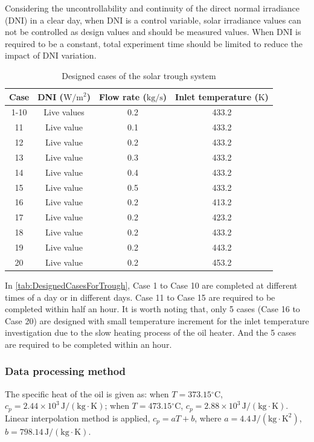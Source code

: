 
Considering the uncontrollability and continuity of the direct normal irradiance (DNI) in a clear day, when DNI is a control variable, solar irradiance values can not be controlled as design values and should be measured values. When DNI is required to be a constant, total experiment time should be limited to reduce the impact of DNI variation.

\begin{table}[htbp]\footnotesize
	\caption{Designed cases of the solar trough system}
	\centering
	\begin{tabular}{cccc}
		\toprule
		Case	& DNI ($\mathrm{W/m^2}$)	&	Flow rate ($\mathrm{kg/s}$)			&	Inlet temperature ($\mathrm{K}$)\\
		\midrule
		1-10	&	Live values	&	0.2	&	433.2\\
		11	&	Live value	&	0.1	&	433.2\\
		12	&	Live value	&	0.2	&	433.2\\
		13	&	Live value	&	0.3	&	433.2\\
		14	&	Live value	&	0.4	&	433.2\\
		15	&	Live value	&	0.5	&	433.2\\
		16	&	Live value	&	0.2	&	413.2\\
		17	&	Live value	&	0.2	&	423.2\\
		18	&	Live value	&	0.2	&	433.2\\
		19	&	Live value	&	0.2	&	443.2\\
		20	&	Live value	&	0.2	&	453.2\\
		\bottomrule
	\end{tabular}
	
	\label{tab:DesignedCasesForTrough}
\end{table}

In \autoref{tab:DesignedCasesForTrough}, Case 1 to Case 10 are completed at different times of a day or in different days. Case 11 to Case 15 are required to be completed within half an hour. It is worth noting that, only 5 cases (Case 16 to Case 20) are designed with small temperature increment for the inlet temperature investigation due to the slow heating process of the oil heater. And the 5 cases are required to be completed within an hour.

\subsubsection{Data processing method}
The specific heat of the oil is given as: when $T = 373.15\mathrm{^\circ C}$, $c_p = 2.44\times10^3\,\mathrm{J/(kg\cdot K)}$; when $T = 473.15\mathrm{^\circ C}$, $c_p = 2.88\times10^3\,\mathrm{J/(kg\cdot K)}$. Linear interpolation method is applied, $c_p = aT + b$, where $a = 4.4\,\mathrm{J/(kg \cdot K^2)}$, $b = 798.14\,\mathrm{J/(kg\cdot K)}$.

